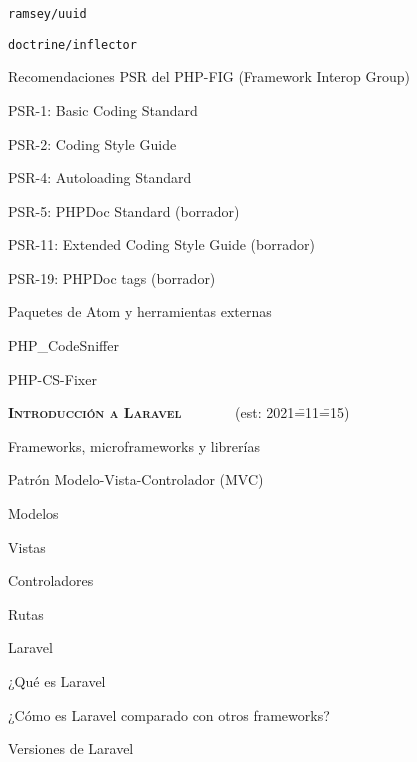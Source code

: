 \begin{longenum}
\begin{longenum}
\begin{longenum}
            \item \texttt{ramsey/uuid}
            \item \texttt{doctrine/inflector}
        \end{longenum}
        \item Recomendaciones PSR del PHP-FIG (Framework Interop Group)
        \begin{longenum}
            \item PSR-1: Basic Coding Standard
            \item PSR-2: Coding Style Guide
            \item PSR-4: Autoloading Standard
            \item PSR-5: PHPDoc Standard (borrador)
            \item PSR-11: Extended Coding Style Guide (borrador)
            \item PSR-19: PHPDoc tags (borrador)
        \end{longenum}
        \item Paquetes de Atom y herramientas externas \opcional\
        \begin{longenum}
            \item PHP\_CodeSniffer
            \item PHP-CS-Fixer
        \end{longenum}
    \end{longenum}
    \item \textbf{\textsc{Introducción a Laravel}} \ \ \ \ \ \ \ (est: 2021\==11\==15)
    \begin{longenum}
        \item Frameworks, microframeworks y librerías
        \item Patrón Modelo-Vista-Controlador (MVC)
        \begin{longenum}
            \item Modelos
            \item Vistas
            \item Controladores
            \item Rutas
        \end{longenum}
        \item Laravel
        \begin{longenum}
            \item ¿Qué es Laravel
            \item ¿Cómo es Laravel comparado con otros frameworks?
            \item Versiones de Laravel

\end{longenum}
\end{longenum}
\end{longenum}
